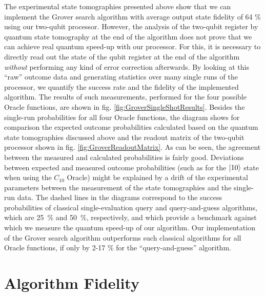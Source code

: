 The experimental state tomographies presented above show that we can implement the Grover search algorithm with average output state fidelity of 64 \% using our two-qubit processor. However, the analysis of the two-qubit register by quantum state tomography at the end of the algorithm does not prove that we can achieve real quantum speed-up with our processor. For this, it is necessary to directly read out the state of the qubit register at the end of the algorithm {\it without} performing any kind of error correction afterwards. By looking at this ``raw'' outcome data and generating statistics over many single runs of the processor, we quantify the success rate and the fidelity of the implemented algorithm. The results of such measurements, performed for the four possible Oracle functions, are shown in fig. \ref{fig:GroverSingleShotResults}. Besides the single-run probabilities for all four Oracle functions, the diagram shows for comparison the expected outcome probabilities calculated based on the quantum state tomographies discussed above and the readout matrix of the two-qubit processor shown in fig. \ref{fig:GroverReadoutMatrix}. As can be seen, the agreement between the measured and calculated probabilities is fairly good. Deviations between expected and measured outcome probabilities (such as for the $\left| 10 \right>$ state when using the $C_{10}$ Oracle) might be explained by a drift of the experimental parameters between the measurement of the state tomographies and the single-run data. The dashed lines in the diagrams correspond to the success probabilities of classical single-evaluation query and query-and-guess algorithms, which are \mbox{25 \%} and \mbox{50 \%}, respectively, and which provide a benchmark against which we measure the quantum speed-up of our algorithm. Our implementation of the Grover search algorithm outperforms such classical algorithms for all Oracle functions, if only by 2-17 \% for the ``query-and-guess'' algorithm.


\section{Algorithm Fidelity}

